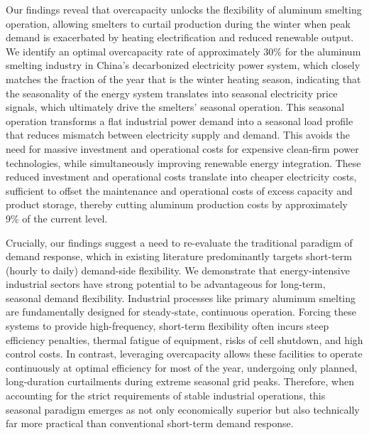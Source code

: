 \documentclass[preprint]{elsarticle}
\begin{document}
Our findings reveal that overcapacity unlocks the flexibility of aluminum smelting operation, allowing smelters to curtail production during the winter when peak demand is exacerbated by heating electrification and reduced renewable output. We identify an optimal overcapacity rate of approximately 30\% for the aluminum smelting industry in China's decarbonized electricity power system, which closely matches the fraction of the year that is the winter heating season, indicating that the seasonality of the energy system translates into seasonal electricity price signals, which ultimately drive the smelters' seasonal operation. This seasonal operation transforms a flat industrial power demand into a seasonal load profile that reduces mismatch between electricity supply and demand. This avoids the need for massive investment and operational costs for expensive clean-firm power technologies, while simultaneously improving renewable energy integration. These reduced investment and operational costs translate into cheaper electricity costs, sufficient to offset the maintenance and operational costs of excess capacity and product storage, thereby cutting aluminum production costs by approximately 9\% of the current level.


Crucially, our findings suggest a need to re-evaluate the traditional paradigm of demand response, which in existing literature predominantly targets short-term (hourly to daily) demand-side flexibility. We demonstrate that energy-intensive industrial sectors have strong potential to be advantageous for long-term, seasonal demand flexibility. Industrial processes like primary aluminum smelting are fundamentally designed for steady-state, continuous operation. Forcing these systems to provide high-frequency, short-term flexibility often incurs steep efficiency penalties, thermal fatigue of equipment, risks of cell shutdown, and high control costs. In contrast, leveraging overcapacity allows these facilities to operate continuously at optimal efficiency for most of the year, undergoing only planned, long-duration curtailments during extreme seasonal grid peaks. Therefore, when accounting for the strict requirements of stable industrial operations, this seasonal paradigm emerges as not only economically superior but also technically far more practical than conventional short-term demand response.
\end{document}
